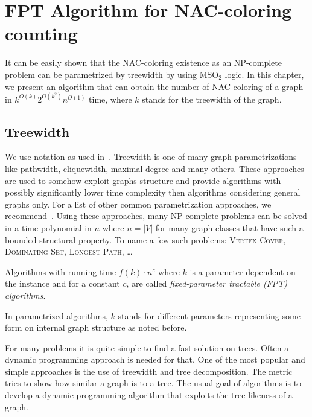 \chapter{FPT Algorithm for NAC-coloring counting}%
\label{chapter:fpt}

\begin{chapterabstract}

	It can be easily shown that the NAC-coloring existence as an NP-complete
	problem can be parametrized by treewidth by using \( \text{MSO}_2 \) logic.
	In this chapter, we present an algorithm that can obtain
	the number of NAC-coloring of a graph in \({k}^{O(k)} 2^{O(k^2)} n^{O(1)}\) time,
	where \(k\) stands for the treewidth of the graph.

\end{chapterabstract}

\section{Treewidth}

We use notation as used in~\cite{book_parametrized_algorithms}.
Treewidth is one of many graph parametrizations like
pathwidth, cliquewidth, maximal degree and many others.
These approaches are used to somehow exploit graphs structure
and provide algorithms with possibly significantly lower time complexity
then algorithms considering general graphs only.
For a list of other common parametrization approaches,
we recommend~\cite{tree_width_comparision_other_classes}.
Using these approaches, many NP-complete problems can be solved
in a time polynomial in \( n \) where \( n = |V| \)
for many graph classes that have such a bounded structural property.
To name a few such problems:
\textsc{Vertex Cover}, \textsc{Dominating Set}, \textsc{Longest Path}, \dots

%
\begin{definition}
	Algorithms with running time \( f(k)\cdot n^c \)
	where \( k \) is a parameter dependent on the instance
	and for a constant \( c \),
	are called \emph{fixed-parameter tractable (FPT) algorithms}.
\end{definition}
%
In parametrized algorithms, \( k \) stands for different parameters
representing some form on internal graph structure as noted before.

For many problems it is quite simple to find a fast solution on trees.
Often a dynamic programming approach is needed for that.
%
One of the most popular and simple approaches
is the use of treewidth and tree decomposition.
The metric tries to show how similar a graph is to a tree.
%
The usual goal of algorithms is to develop a dynamic programming algorithm
that exploits the tree-likeness of a graph.

